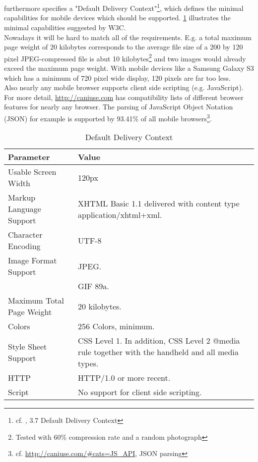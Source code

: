 \\
\\
\cite{WorldWideWebConsortium.2008} furthermore specifies a "Default Delivery Context"\footnote{cf. \cite{WorldWideWebConsortium.2008}, 3.7 Default Delivery Context}, which defines the minimal capabilities for mobile devices which should be supported. \ref{tab:DefaultDeliveryContext} illustrates the minimal capabilities suggested by W3C.
\\
Nowadays it will be hard to match all of the requirements. E.g. a total maximum page weight of 20 kilobytes corresponds to the average file size of a 200 by 120 pixel JPEG-compressed file is abut 10 kilobytes\footnote{Tested with 60\% compression rate and a random photograph} and two images would already exceed the maximum page weight. With mobile devices like a Samsung Galaxy S3 which has a minimum of 720 pixel wide display, 120 pixels are far too less.
\\
Also nearly any mobile browser supports client side scripting (e.g. JavaScript). For more detail, \url{http://caniuse.com} has compatibility lists of different browser features for nearly any browser. The parsing of JavaScript Object Notation (JSON) for example is supported by 93.41\% of all mobile browsers\footnote{cf. \url{http://caniuse.com/\#cats=JS_API}, JSON parsing}.
\begin{table}[!tb]
    \center
    \begin{tabular}{l | p{21.5em}}
        \textbf{Parameter} & \textbf{Value} \\
        \hline
        Usable Screen Width & 120px \\
        \hline
        Markup Language Support & XHTML Basic 1.1 delivered with content type application/xhtml+xml. \\
        \hline
        Character Encoding & UTF-8 \\
        \hline
        Image Format Support & JPEG. \\
        & GIF 89a. \\
        \hline
        Maximum Total Page Weight & 20 kilobytes. \\
        \hline
        Colors & 256 Colors, minimum. \\
        \hline
        Style Sheet Support & CSS Level 1. In addition, CSS Level 2 @media rule together with the handheld and all media types. \\
        \hline
        HTTP & HTTP/1.0 or more recent. \\
        \hline
        Script & No support for client side scripting. \\
    \end{tabular}
    \caption[Mobile Default Delivery Context]{Default Delivery Context\footnotemark}
    \label{tab:DefaultDeliveryContext}
\end{table}
